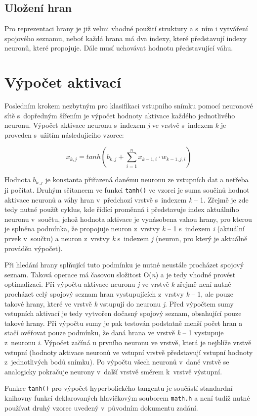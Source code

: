 \documentclass[12pt, a4paper, titlepage]{report}
\begin{document}
\subsection{Uložení hran}
Pro reprezentaci hrany je již velmi vhodné použití struktury a s~ním i vytváření spojového seznamu, neboť každá hrana má dva indexy, které představují indexy neuronů, které propojuje. Dále musí uchovávat hodnotu představující váhu.
\section{Výpočet aktivací}
Posledním krokem nezbytným pro klasifikaci vstupního snímku pomocí neuronové sítě s~dopředným šířením je výpočet hodnoty aktivace každého jednotlivého neuronu.
Výpočet aktivace neuronu s~indexem \textit{j} ve vrstvě s~indexem \textit{k} je proveden s~užitím následujícího vzorce:
\par\noindent
$$x_{k,j} = tanh\left(b_{k,j} + \sum\limits_{i=1}^n x_{k-1,i} \cdot w_{k-1,j,i}\right)$$
\par\noindent
Hodnota $b_{k,j}$   je konstanta přiřazená danému neuronu ze vstupních dat a netřeba ji počítat. Druhým sčítancem ve funkci \texttt{tanh()} ve vzorci je suma součinů hodnot aktivace neuronů a váhy hran v~předchozí vrstvě s~indexem \textit{k} – 1. Zřejmě je zde tedy nutné použít cyklus, kde řídící proměnná i představuje index aktuálního neuronu v~součtu, jehož hodnota aktivace je vynásobena vahou hrany, pro kterou je splněna podmínka, že propojuje neuron z~vrstvy \textit{k} – 1 s~indexem \textit{i} (aktuální prvek v~součtu) a neuron z~vrstvy \textit{k} s~indexem \textit{j} (neuron, pro který je aktuálně prováděn výpočet). \par
Při hledání hrany splňující tuto podmínku je nutné neustále procházet spojový seznam. Taková operace má časovou složitost O(\textit{n}) a je tedy vhodné provést optimalizaci. Při výpočtu aktivace neuronu \textit{j} ve vrstvě \textit{k} zřejmě není nutné procházet celý spojový seznam hran vystupujících z~vrstvy \textit{k} – 1, ale pouze takové hrany, které ve vrstvě \textit{k} vstupují do neuronu \textit{j}. Před výpočtem sumy vstupních aktivací je tedy vytvořen dočasný spojový seznam, obsahující pouze takové hrany. Při výpočtu sumy je pak testován podstatně menší počet hran a stačí ověřovat pouze podmínku, že daná hrana ve vrstvě \textit{k} – 1 vystupuje z~neuronu \textit{i}.
Výpočet začíná u prvního neuronu ve vrstvě, která je nejblíže vrstvě vstupní (hodnoty aktivace neuronů ve vstupní vrstvě představují vstupní hodnoty z~jednotlivých bodů snímku). Po výpočtu všech neuronů v~dané vrstvě se analogicky pokračuje neurony v~další vrstvě směrem k~vrstvě výstupní.\par
Funkce \texttt{tanh()} pro výpočet hyperbolického tangentu je součástí standardní knihovny funkcí deklarovaných hlavičkovým souborem \texttt{math.h} a není tudíž nutné používat druhý vzorec uvedený v~původním dokumentu zadání.
\end{document}
